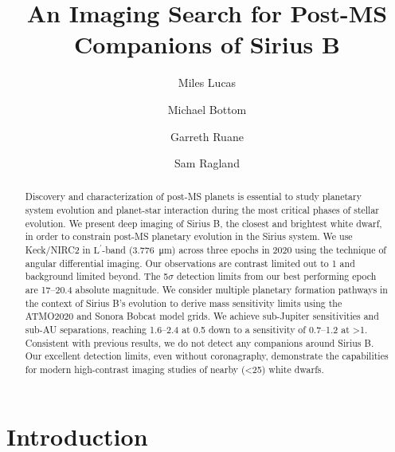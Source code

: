 \documentclass[twocolumn]{aastex631}
\newcommand\Lp{$\mathrm{L}^\prime$}
\begin{document}
\title{An Imaging Search for Post-MS Companions of Sirius B}



\author[0000-0001-6341-310X]{Miles Lucas}

\author[0000-0003-1341-5531]{Michael Bottom}

\author[0000-0003-4769-1665]{Garreth Ruane}

\author[0000-0002-0696-1780]{Sam Ragland}


\begin{abstract}
Discovery and characterization of post-MS planets is essential to study planetary system evolution and planet-star interaction during the most critical phases of stellar evolution. We present deep imaging of Sirius B, the closest and brightest white dwarf, in order to constrain post-MS planetary evolution in the Sirius system. We use Keck/NIRC2 in \Lp-band (\qty{3.776}{\micro\meter}) across three epochs in 2020 using the technique of angular differential imaging. Our observations are contrast limited out to \qty{1}{\au} and background limited beyond. The 5$\sigma$ detection limits from our best performing epoch are \numrange{17}{20.4} absolute magnitude. We consider multiple planetary formation pathways in the context of Sirius B's evolution to derive mass sensitivity limits using the ATMO2020 and Sonora Bobcat model grids. We achieve sub-Jupiter sensitivities and sub-AU separations, reaching \qtyrange{1.6}{2.4}{\jupitermass} at \qty{0.5}{\au} down to a sensitivity of \qtyrange{0.7}{1.2}{\jupitermass} at \textgreater\qty{1}{\au}. Consistent with previous results, we do not detect any companions around Sirius B. Our excellent detection limits, even without coronagraphy, demonstrate the capabilities for modern high-contrast imaging studies of nearby (\textless\qty{25}{\parsec}) white dwarfs.
\end{abstract}

\section{Introduction}\label{sec:intro}
\end{document}
